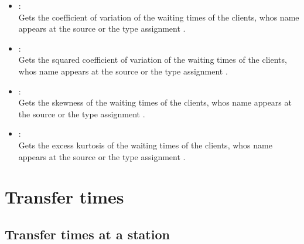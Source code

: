 \begin{itemize}
\item
{}:\\
Gets the coefficient of variation of the waiting times of the clients, whos name appears at the source or the type assignment .

\item
{}:\\
Gets the squared coefficient of variation of the waiting times of the clients, whos name appears at the source or the type assignment .

\item
{}:\\
Gets the skewness of the waiting times of the clients, whos name appears at the source or the type assignment .

\item
{}:\\
Gets the excess kurtosis of the waiting times of the clients, whos name appears at the source or the type assignment .

\end{itemize}



\section{Transfer times}



\subsection{Transfer times at a station}

